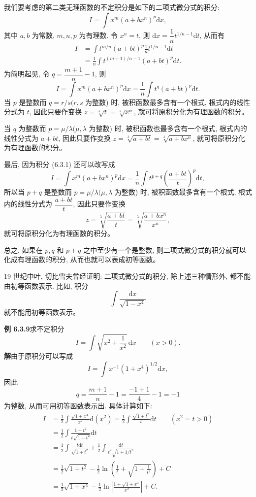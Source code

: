 \documentclass[UTF8, 12pt, fontset=fandol, oneside]{ctexart}
\begin{document}
我们要考虑的第二类无理函数的不定积分是如下的二项式微分式的积分:
\[
  I=\int x^m(a+bx^n)^p\mathrm dx,
\]
其中 $a,b$ 为常数, $m,n,p$ 为有理数. 令 $x^n=t$, 则 $\mathrm dx=\dfrac1n t^{1/n-1}\mathrm dt$, 从而有
\[
\begin{aligned}
  I
  &=
  \int t^{m/n}(a+bt)^p\frac1n t^{1/n-1}\mathrm dt\\
  &=
  \frac1n\int t^{(m+1)/n-1}(a+bt)^p\mathrm dt.
\end{aligned}
\]
为简明起见, 令 $q=\dfrac{m+1}n-1$, 则
\begin{equation}
  I=\int x^m(a+bx^n)^p\mathrm dx
  =
  \frac1n\int t^q(a+bt)^p\mathrm dt.
  \tag{6.3.1}
\end{equation}
当 $p$ 是整数而 $q=r/s(r,s$ 为整数) 时, 被积函数最多含有一个根式, 根式内的线性分式为 $t$, 因此只要作变换 $z=\sqrt[s]{t}=\sqrt[s]{x^n}$, 就可将原积分化为有理函数的积分。

当 $q$ 为整数而 $p=\mu/\lambda(\mu,\lambda$ 为整数) 时, 被积函数也最多含有一个根式, 根式内的线性分式为 $a+bt$, 因此只要作变换 $z=\sqrt[\lambda]{a+bt}=\sqrt[\lambda]{a+bx^n}$, 就可将原积分化为有理函数的积分。

最后, 因为积分 (6.3.1) 还可以改写成
\[
  I=\int x^m(a+bx^n)^p\mathrm dx
  =
  \frac1n\int t^{p+q}\left(\frac{a+bt}{t}\right)^p\mathrm dt,
\]
所以当 $p+q$ 是整数而 $p=\mu/\lambda(\mu,\lambda$ 为整数) 时, 被积函数最多含有一个根式, 根式内的线性分式为 $\dfrac{a+bt}{t}$, 因此只要作变换
\[
  z=\sqrt[\lambda]{\frac{a+bt}{t}}
  =
  \sqrt[\lambda]{\frac{a+bx^n}{x^n}},
\]
就可将原积分化为有理函数的积分。

总之, 如果在 $p,q$ 和 $p+q$ 之中至少有一个是整数, 则二项式微分式的积分就可以化成有理函数的积分, 从而也就可以表成初等函数。

19 世纪中叶, 切比雪夫曾经证明: 二项式微分式的积分, 除上述三种情形外, 都不能由初等函数表示. 比如, 积分
\[
  \int\frac{\mathrm dx}{\sqrt{1-x^4}}
\]
就不能用初等函数表示。

\noindent\textbf{例 6.3.9}\quad 求不定积分
\[
  I=\int\sqrt{x^2+\frac1{x^2}}\,\mathrm dx\qquad(x>0).
\]
\noindent\textbf{解}\quad 由于原积分可以写成
\[
  I=\int x^{-1}(1+x^4)^{1/2}\mathrm dx,
\]
因此
\[
  q=\frac{m+1}n-1=\frac{-1+1}4-1=-1
\]
为整数, 从而可用初等函数表示出. 具体计算如下:
\[
\begin{aligned}
  I
  &=
  \frac12\int\frac{\sqrt{1+x^4}}{x^2}\mathrm d(x^2)
  =
  \frac12\int\frac{\sqrt{1+t^2}}{t}\mathrm dt
  \qquad(x^2=t>0)\\
  &=
  \frac12\int\frac{1+t^2}{t\sqrt{1+t^2}}\mathrm dt\\
  &=
  \frac12\int\frac{t\mathrm dt}{\sqrt{1+t^2}}
  +\frac12\int\frac{\mathrm dt}{t^2\sqrt{1+1/t^2}}\\
  &=
  \frac12\sqrt{1+t^2}-\frac12\ln\left(\frac1t+\sqrt{1+\frac1{t^2}}\right)+C\\
  &=
  \frac12\sqrt{1+x^4}
  -\frac12\ln\left|\frac{1+\sqrt{1+x^4}}{x^2}\right|+C.
\end{aligned}
\]
\end{document}
